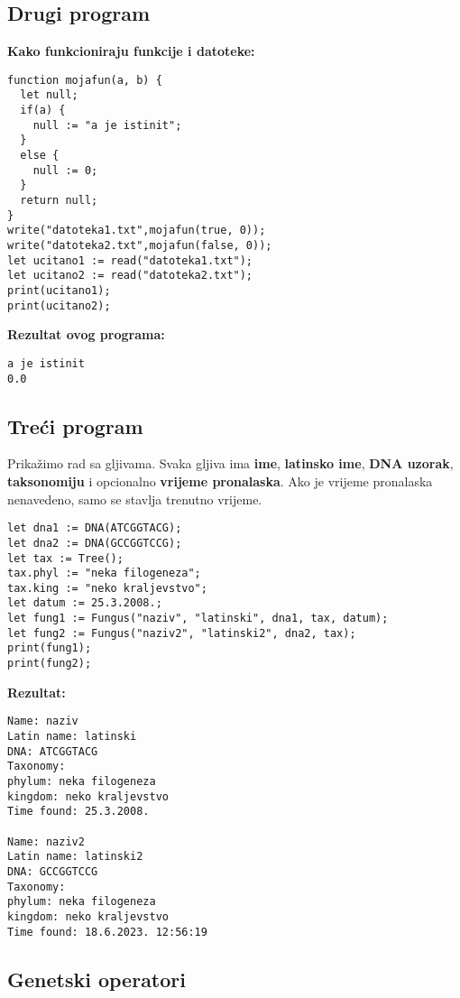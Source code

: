 \documentclass[12pt]{scrartcl}
\begin{document}
\subsection{Drugi program}
\textbf{Kako funkcioniraju funkcije i datoteke:}
\begin{lstlisting}
function mojafun(a, b) {
  let null;
  if(a) {
    null := "a je istinit";
  }
  else {
    null := 0;
  }
  return null;
}
write("datoteka1.txt",mojafun(true, 0));
write("datoteka2.txt",mojafun(false, 0));
let ucitano1 := read("datoteka1.txt");
let ucitano2 := read("datoteka2.txt");
print(ucitano1);
print(ucitano2);
\end{lstlisting}
\textbf{Rezultat ovog programa:}
\begin{lstlisting}
a je istinit
0.0
\end{lstlisting}
\subsection{Treći program}
Prikažimo rad sa gljivama. Svaka gljiva ima \textbf{ime}, \textbf{latinsko ime}, \textbf{DNA uzorak}, \textbf{taksonomiju} i opcionalno
\textbf{vrijeme pronalaska}. Ako je vrijeme pronalaska nenavedeno, samo se stavlja trenutno vrijeme.
\begin{lstlisting}
let dna1 := DNA(ATCGGTACG);
let dna2 := DNA(GCCGGTCCG);
let tax := Tree();
tax.phyl := "neka filogeneza";
tax.king := "neko kraljevstvo";
let datum := 25.3.2008.;
let fung1 := Fungus("naziv", "latinski", dna1, tax, datum);
let fung2 := Fungus("naziv2", "latinski2", dna2, tax);
print(fung1);
print(fung2);
\end{lstlisting}
\textbf{Rezultat:}
\begin{lstlisting}
Name: naziv
Latin name: latinski
DNA: ATCGGTACG
Taxonomy: 
phylum: neka filogeneza
kingdom: neko kraljevstvo
Time found: 25.3.2008.

Name: naziv2
Latin name: latinski2
DNA: GCCGGTCCG
Taxonomy: 
phylum: neka filogeneza
kingdom: neko kraljevstvo
Time found: 18.6.2023. 12:56:19

\end{lstlisting}
\subsection{Genetski operatori}
\end{document}
